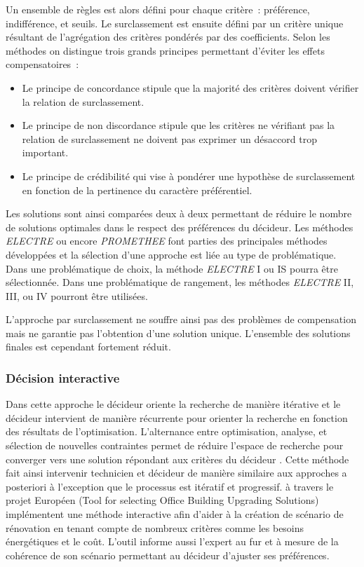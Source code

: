 Un ensemble de règles est alors défini pour chaque critère~: préférence, indifférence,
et seuils. Le surclassement est ensuite défini par un critère unique résultant de
l’agrégation des critères pondérés par des coefficients. Selon les méthodes on distingue
trois grands principes permettant d’éviter les effets compensatoires~:
\begin{itemize}
  \item Le principe de concordance stipule que la majorité des critères doivent
        vérifier la relation de surclassement.
  \item Le principe de non discordance stipule que les critères ne vérifiant pas
        la relation de surclassement ne doivent pas exprimer un désaccord trop
        important.
  \item Le principe de crédibilité qui vise à pondérer une hypothèse de surclassement
        en fonction de la pertinence du caractère préférentiel.
\end{itemize}
Les solutions sont ainsi comparées deux à deux permettant de réduire le nombre de
solutions optimales dans le respect des préférences du décideur. Les méthodes
\textit{ELECTRE} ou encore \textit{PROMETHEE} font parties des principales méthodes développées
et la sélection d’une approche est liée au type de problématique. Dans une problématique de
choix, la méthode \textit{ELECTRE} I ou IS pourra être sélectionnée. Dans une
problématique de rangement, les méthodes \textit{ELECTRE} II, III, ou IV pourront être
utilisées.

L’approche par surclassement ne souffre ainsi pas des problèmes de compensation
mais ne garantie pas l’obtention d’une solution unique. L’ensemble des solutions
finales est cependant fortement réduit.


\subsubsection{Décision interactive} %
\label{ssub:decision_interactive}
Dans cette approche le décideur oriente la recherche de manière itérative et le décideur
intervient de manière récurrente pour orienter la recherche en fonction des résultats de
l’optimisation. L’alternance entre optimisation, analyse, et sélection de nouvelles
contraintes permet de réduire l’espace de recherche pour converger vers une solution
répondant aux critères du décideur \parencite{Hwang1979}. Cette méthode fait ainsi
intervenir technicien et décideur de manière similaire aux approches a posteriori à
l’exception que le processus est itératif et progressif.
\textcite{Flourentzou2002185} à travers le projet Européen  (Tool for selecting Office Building
Upgrading Solutions) implémentent une méthode interactive afin d’aider
à la création de scénario de rénovation en tenant compte de nombreux critères comme les
besoins énergétiques et le coût. L’outil informe aussi l’expert au fur et à mesure de la
cohérence de son scénario permettant au décideur d’ajuster ses préférences.


